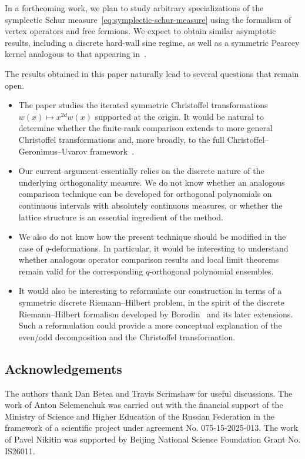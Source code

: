 \documentclass[reqno,11pt]{amsart}
\theoremstyle{plain}
\theoremstyle{definition}
\numberwithin{equation}{section}
\begin{document}
In a forthcoming work, we plan to study arbitrary specializations of the symplectic Schur measure~\eqref{eq:symplectic-schur-measure} using the formalism of vertex operators and free fermions. We expect to obtain similar asymptotic results, including a discrete hard-wall sine regime, as well as a symmetric Pearcey kernel analogous to that appearing in~\cite{cuenca2024symplecticschurprocess}.

The results obtained in this paper naturally lead to several questions that remain open.

\begin{itemize}
\item 
The paper studies the iterated symmetric Christoffel transformations $w(x)\mapsto x^{2d}w(x)$ supported at the origin. It would be natural to determine whether the finite-rank comparison extends to more general Christoffel transformations and, more broadly, to the full Christoffel--Geronimus--Uvarov framework~\cite{ZHEDANOV199767}.
\item
Our current argument essentially relies on the discrete nature of the underlying orthogonality measure. We do not know whether an analogous comparison technique can be developed for orthogonal polynomials on continuous intervals with absolutely continuous measures, or whether the lattice structure is an essential ingredient of the method.
\item
We also do not know how the present technique should be modified in the case of $q$-deformations. In particular, it would be interesting to understand whether analogous operator comparison results and local limit theorems remain valid for the corresponding $q$-orthogonal polynomial ensembles.
\item
It would also be interesting to reformulate our construction in terms of a symmetric discrete Riemann--Hilbert problem, in the spirit of the discrete Riemann--Hilbert formalism developed by Borodin~\cite{Borodin_2003,10.1215/S0012-7094-06-13433-6} and its later extensions. Such a reformulation could provide a more conceptual explanation of the even/odd decomposition and the Christoffel transformation.

\end{itemize}


\subsection*{Acknowledgements} 
The authors thank Dan Betea and Travis Scrimshaw for useful discussions. The work of Anton Selemenchuk was carried out with the financial support of the Ministry of Science and Higher Education of the Russian Federation in the framework of a scientific project under agreement No. 075-15-2025-013. The work of Pavel Nikitin was supported by Beijing National Science Foundation Grant No. IS26011.
\end{document}
